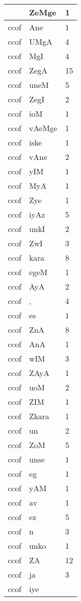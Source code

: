 \documentclass[a4 paper]{article}
\begin{document}
\begin{longtable}{cp{}p{}}
& ZeMge & 1\\ \midrule ccof & Ane & 1\\ \midrule ccof & UMgA & 4\\ \midrule ccof & MgI & 4\\ \midrule ccof & ZegA & 15\\ \midrule ccof & uneM & 5\\ \midrule ccof & ZegI & 2\\ \midrule ccof & ioM & 1\\ \midrule ccof & vAeMge & 1\\ \midrule ccof & iske & 1\\ \midrule ccof & vAne & 2\\ \midrule ccof & yIM & 1\\ \midrule ccof & MyA & 1\\ \midrule ccof & Zye & 1\\ \midrule ccof & iyAz & 5\\ \midrule ccof & unkI & 2\\ \midrule ccof & ZwI & 3\\ \midrule ccof & kara & 8\\ \midrule ccof & egeM & 1\\ \midrule ccof & AyA & 2\\ \midrule ccof & , & 4\\ \midrule ccof & es & 1\\ \midrule ccof & ZnA & 8\\ \midrule ccof & AnA & 1\\ \midrule ccof & wIM & 3\\ \midrule ccof & ZAyA & 1\\ \midrule ccof & uoM & 2\\ \midrule ccof & ZIM & 1\\ \midrule ccof & Zkara & 1\\ \midrule ccof & un & 2\\ \midrule ccof & ZoM & 5\\ \midrule ccof & unse & 1\\ \midrule ccof & eg & 1\\ \midrule ccof & yAM & 1\\ \midrule ccof & av & 1\\ \midrule ccof & ez & 5\\ \midrule ccof & n & 3\\ \midrule ccof & unko & 1\\ \midrule ccof & ZA & 12\\ \midrule ccof & ja & 3\\ \midrule ccof & iye & 
\end{longtable}
\end{document}
